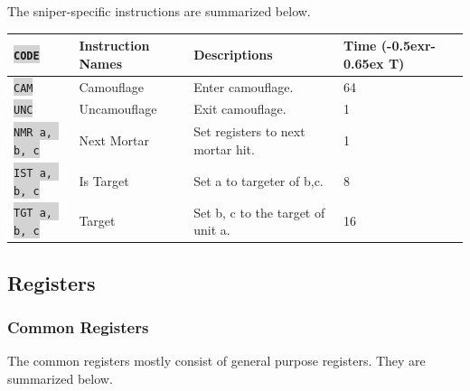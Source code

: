 \documentclass{article}
\newcommand{\vnscode}[1]{\colorbox{lightgray}{\lstinline[language=vns]{#1}}}
\newcommand{\RT}{\lower-0.5ex\hbox{r}\kern-0.65ex T}
\begin{document}
The sniper-specific instructions are summarized below.

\begin{minipage}{\textwidth}
\label{table:sniper}
\centering
\begin{tabular}{llll}
    \hline \vnscode{CODE} & Instruction Names & Descriptions & Time (\RT) \\ \hline
    \vnscode{CAM} & Camouflage & Enter camouflage. & 64 \\
    \vnscode{UNC} & Uncamouflage & Exit camouflage. & 1 \\
    \vnscode{NMR a, b, c} & Next Mortar & Set registers to next mortar hit. & 1 \\
    \vnscode{IST a, b, c} & Is Target & Set a to targeter of b,c. & 8 \\
    \vnscode{TGT a, b, c} & Target & Set b, c to the target of unit a. & 16 \\
\end{tabular}
\end{minipage}

\subsection{Registers}


\subsubsection{Common Registers}

The common registers mostly consist of general purpose registers. They are
summarized below.
\end{document}

